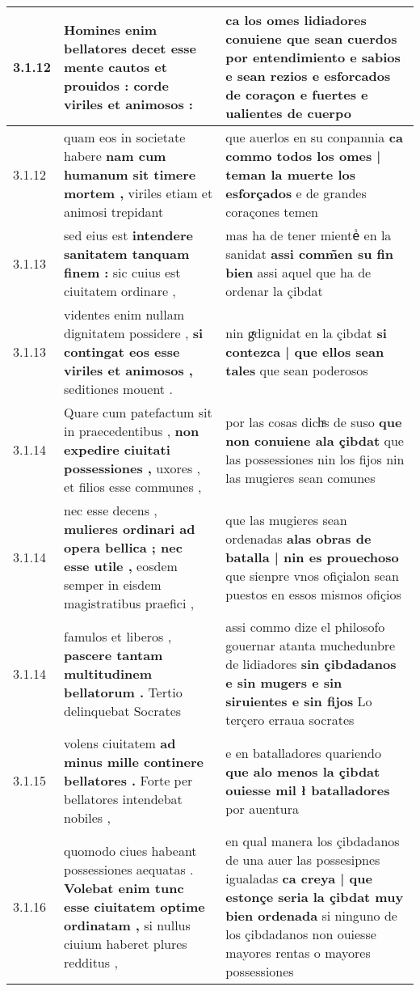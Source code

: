 \begin{tabular}{|p{1cm}|p{6.5cm}|p{6.5cm}|}
3.1.12 & Homines enim bellatores decet \textbf{ esse mente cautos et prouidos : } corde viriles et animosos : & ca los omes lidiadores conuiene que sean cuerdos \textbf{ por entendimiento e sabios } e sean rezios e esforcados de coraçon e fuertes e ualientes de cuerpo \\\hline
3.1.12 & quam eos in societate habere \textbf{ nam cum humanum sit timere mortem , } viriles etiam et animosi trepidant & que auerlos en su conpannia \textbf{ ca commo todos los omes | teman la muerte los esforçados } e de grandes coraçones temen \\\hline
3.1.13 & sed eius est \textbf{ intendere sanitatem tanquam finem : } sic cuius est ciuitatem ordinare , & mas ha de tener mienteᷤ en la sanidat \textbf{ assi comm̃en su fin bien } assi aquel que ha de ordenar la çibdat \\\hline
3.1.13 & videntes enim nullam dignitatem possidere , \textbf{ si contingat eos esse viriles et animosos , } seditiones mouent . & nin gͤdignidat en la çibdat \textbf{ si contezca | que ellos sean tales } que sean poderosos \\\hline
3.1.14 & Quare cum patefactum sit in praecedentibus , \textbf{ non expedire ciuitati possessiones , } uxores , et filios esse communes , & por las cosas dichͣs de suso \textbf{ que non conuiene ala çibdat } que las possessiones nin los fijos nin las mugieres sean comunes \\\hline
3.1.14 & nec esse decens , \textbf{ mulieres ordinari ad opera bellica ; nec esse utile , } eosdem semper in eisdem magistratibus praefici , & que las mugieres sean ordenadas \textbf{ alas obras de batalla | nin es prouechoso } que sienpre vnos ofiçialon sean puestos en essos mismos ofiçios \\\hline
3.1.14 & famulos et liberos , \textbf{ pascere tantam multitudinem bellatorum . } Tertio delinquebat Socrates & assi commo dize el philosofo gouernar atanta muchedunbre de lidiadores \textbf{ sin çibdadanos e sin mugers e sin siruientes e sin fijos } Lo terçero erraua socrates \\\hline
3.1.15 & volens ciuitatem \textbf{ ad minus mille continere bellatores . } Forte per bellatores intendebat nobiles , & e en batalladores quariendo \textbf{ que alo menos la çibdat ouiesse mil ł batalladores } por auentura \\\hline
3.1.16 & quomodo ciues habeant possessiones aequatas . \textbf{ Volebat enim tunc esse ciuitatem optime ordinatam , } si nullus ciuium haberet plures redditus , & en qual manera los çibdadanos de una auer las possesipnes igualadas \textbf{ ca creya | que estonçe seria la çibdat muy bien ordenada } si ninguno de los çibdadanos non ouiesse mayores rentas o mayores possessiones \\\hline

\end{tabular}

